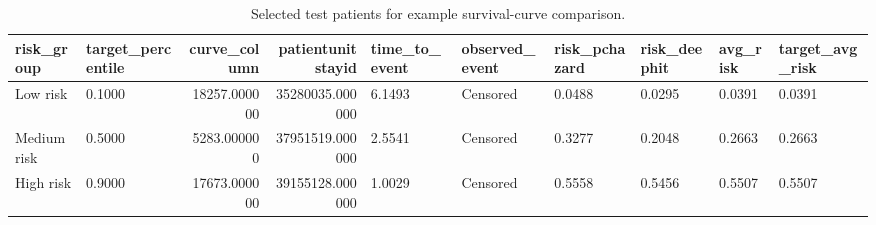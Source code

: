 \begin{table}
\caption{Selected test patients for example survival-curve comparison.}
\label{tab:example_survival_curve_patients}
\begin{tabular}{llrrllllll}
\toprule
risk_group & target_percentile & curve_column & patientunitstayid & time_to_event & observed_event & risk_pchazard & risk_deephit & avg_risk & target_avg_risk \\
\midrule
Low risk & 0.1000 & 18257.000000 & 35280035.000000 & 6.1493 & Censored & 0.0488 & 0.0295 & 0.0391 & 0.0391 \\
Medium risk & 0.5000 & 5283.000000 & 37951519.000000 & 2.5541 & Censored & 0.3277 & 0.2048 & 0.2663 & 0.2663 \\
High risk & 0.9000 & 17673.000000 & 39155128.000000 & 1.0029 & Censored & 0.5558 & 0.5456 & 0.5507 & 0.5507 \\
\bottomrule
\end{tabular}
\end{table}
